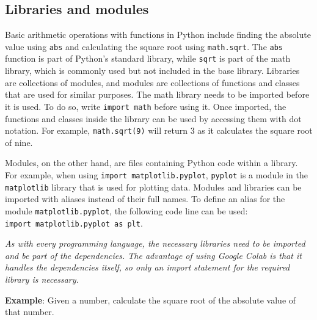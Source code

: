 \documentclass[11pt]{article}
\begin{document}
    \subsection{Libraries and modules}\label{libraries-and-modules}

Basic arithmetic operations with functions in Python include finding the
absolute value using \texttt{abs} and calculating the square root using
\texttt{math.sqrt}. The \texttt{abs} function is part of Python's
standard library, while \texttt{sqrt} is part of the math library, which
is commonly used but not included in the base library. Libraries are
collections of modules, and modules are collections of functions and
classes that are used for similar purposes. The math library needs to be
imported before it is used. To do so, write \texttt{import\ math} before
using it. Once imported, the functions and classes inside the library
can be used by accessing them with dot notation. For example,
\texttt{math.sqrt(9)} will return 3 as it calculates the square root of
nine.

Modules, on the other hand, are files containing Python code within a
library. For example, when using \texttt{import\ matplotlib.pyplot},
\texttt{pyplot} is a module in the \texttt{matplotlib} library that is
used for plotting data. Modules and libraries can be imported with
aliases instead of their full names. To define an alias for the module
\texttt{matplotlib.pyplot}, the following code line can be used:
\texttt{import\ matplotlib.pyplot\ as\ plt}.

\emph{As with every programming language, the necessary libraries need
to be imported and be part of the dependencies. The advantage of using
Google Colab is that it handles the dependencies itself, so only an
import statement for the required library is necessary.} \newpage

\textbf{Example}: Given a number, calculate the square root of the
absolute value of that number.
\end{document}
